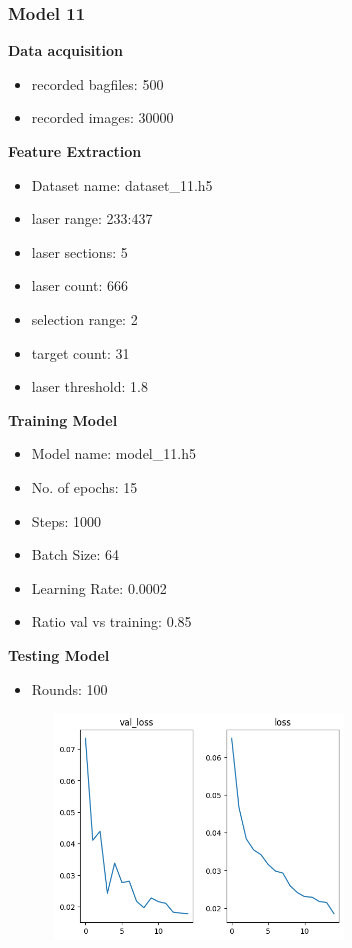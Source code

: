 \subsubsection{Model 11\label{model_11} }
\begin{multicols}{2}\textbf{Data acquisition}
\begin{itemize}
\setlength\itemsep{0.1em}
\item recorded bagfiles: 500
\item recorded images: 30000
\end{itemize}
\textbf{Feature Extraction}
\begin{itemize}
\setlength\itemsep{0.1em}
\item Dataset name: dataset\_11.h5
\item  laser range: 233:437
\item  laser sections: 5
\item  laser count: 666
\item  selection range: 2
\item  target count: 31
\item  laser threshold: 1.8
\end{itemize}
\columnbreak\textbf{Training Model}
\begin{itemize}
\setlength\itemsep{0.1em}
\item  Model name: model\_11.h5
\item  No. of epochs: 15
\item  Steps: 1000
\item  Batch Size: 64
\item  Learning Rate: 0.0002
\item  Ratio val vs training: 0.85
\end{itemize}
\textbf{Testing Model}
\begin{itemize}
\setlength\itemsep{0.1em}
\item Rounds: 100
\newline
\newline
\newline
\newline
\newline
\newline
\newline
\newline
\end{itemize}
\end{multicols}\begin{figure}[H]%
\centering
\includegraphics[width=8cm,height=6cm]{3_models/models_11/graph_11.png}

\end{figure}
